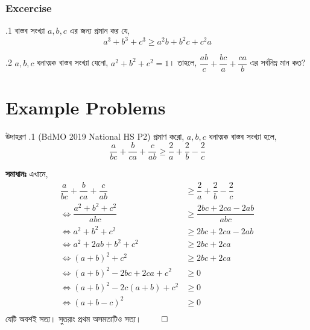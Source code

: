 \documentclass[12pt]{article}
\begin{document}
\subsubsection{Excercise}
\begin{prob} {\thesubsubsection.1}
    বাস্তব সংখ্যা $a,b,c$ এর জন্য প্রমান কর যে,
    $$ a^3+b^3+c^3 \geq a^2b+b^2c+c^2a $$
\end{prob}

\begin{prob} {\thesubsubsection.2}
    $a,b,c$ ধনাত্মক বাস্তব সংখ্যা যেনো, $a^2 + b^2 + c^2 = 1$। তাহলে, $\dfrac{ab}{c} + \dfrac{bc}{a} + \dfrac{ca}{b}$ এর সর্বনিম্ন মান কত?
\end{prob}


\section{Example Problems}
\begin{exam} {উদাহরণ \thesection.1 (BdMO 2019 National HS P2)}
    প্রমাণ করো, $a,b,c$ ধনাত্মক বাস্তব সংখ্যা হলে,
    $$\dfrac{a}{bc} + \dfrac{b}{ca} + \dfrac{c}{ab} \geq \dfrac{2}{a} +\dfrac{2}{b}-\dfrac{2}{c}$$
\end{exam}
\begin{sol}
    \textbf{সমাধানঃ} এখানে, \begin{align*}
        \dfrac{a}{bc} + \dfrac{b}{ca} + \dfrac{c}{ab} &\geq \dfrac{2}{a} +\dfrac{2}{b}-\dfrac{2}{c}\\
        \iff \dfrac{a^2+b^2+c^2}{abc} &\geq \dfrac{2bc + 2ca - 2ab}{abc}\\
        \iff a^2 + b^2+c^2 &\geq 2bc+2ca - 2ab\\
        \iff a^2 + 2ab + b^2 + c^2 &\geq 2bc+2ca\\
        \iff(a+b)^2 + c^2 &\geq 2bc+2ca\\
        \iff(a+b)^2 - 2bc+2ca + c^2 &\geq 0\\
        \iff(a+b)^2 - 2c(a+b) + c^2 &\geq 0\\
        \iff(a+b-c)^2 &\geq 0\\
    \end{align*}
    যেটি অবশই সত্য। সুতরাং প্রথম অসমতাটিও সত্য। $\qed$
\end{sol}
\end{document}
